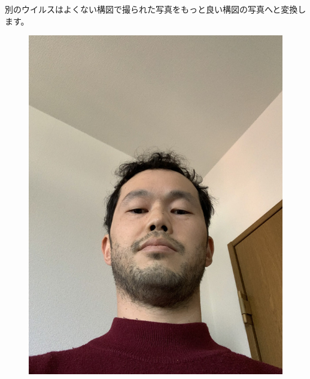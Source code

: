\documentclass[12pt, unicode]{beamer}
\begin{document}
\begin{frame}

別のウイルスはよくない構図で撮られた写真をもっと良い構図の写真へと変換します。

\begin{figure}[htbp]
  \begin{minipage}[b]{0.4\linewidth}
    \centering
    \includegraphics[keepaspectratio, scale=0.15]{pic3.jpg}
  \end{minipage}
  \begin{minipage}[b]{0.18\linewidth}
  \end{minipage}
  \begin{minipage}[b]{0.4\linewidth}
    \centering

\end{minipage}
\end{figure}
\end{frame}
\end{document}
